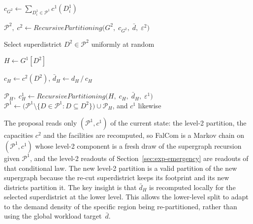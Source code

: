 \documentclass[11pt]{article}
\theoremstyle{definition}
\begin{document}
\begin{algorithm}[tbp]
\LinesNumbered
\caption{Hierarchical proposal}\label{alg:proposal}

\BlankLine
{}

$c_{G^2} \leftarrow \sum_{D_i^1 \in \mathcal{P}^1} c^1(D_i^1)$\;

$\mathcal{P}^2,\; c^2 \leftarrow
    \textit{RecursivePartitioning}\bigl(G^2,\; c_{G^2},\;
    \bar{d},\; \varepsilon^2\bigr)$ 

Select superdistrict $D^2 \in \mathcal{P}^2$ uniformly at random\;

\BlankLine
{}

$H \leftarrow G^1[D^2]$\;

$c_H \leftarrow c^2(D^2)$, \quad $\bar{d}_H \leftarrow d_H \,/\, c_H$\;

$\mathcal{P}_H,\; c^1_H \leftarrow \textit{RecursivePartitioning}\bigl(H,\; c_H,\; \bar{d}_H,\; \varepsilon^1\bigr)$ 
$\mathcal{P}^1 \leftarrow \bigl(\mathcal{P}^1 \setminus \{D \in \mathcal{P}^1 : D \subseteq D^2\}\bigr) \cup \mathcal{P}_H$, and $c^1$ likewise\;

\end{algorithm}
\medskip
\medskip

The proposal reads only $(\mathcal{P}^1, c^1)$ of the current state: the level-2 partition, the capacities $c^2$ and the facilities are recomputed, so FalCom is a Markov chain on $(\mathcal{P}^1, c^1)$ whose level-2 component is a fresh draw of the supergraph recursion given $\mathcal{P}^1$, and the level-2 readouts of Section~\ref{sec:exp-emergency} are readouts of that conditional law. The new level-2 partition is a valid partition of the new supergraph because the re-cut superdistrict keeps its footprint and its new districts partition it. The key insight is that $\bar{d}_H$ is recomputed locally for the selected superdistrict at the lower level.  This allows the lower-level split to adapt
to the demand density of the specific region being re-partitioned, rather than
using the global workload target~$\bar{d}$.
\end{document}

